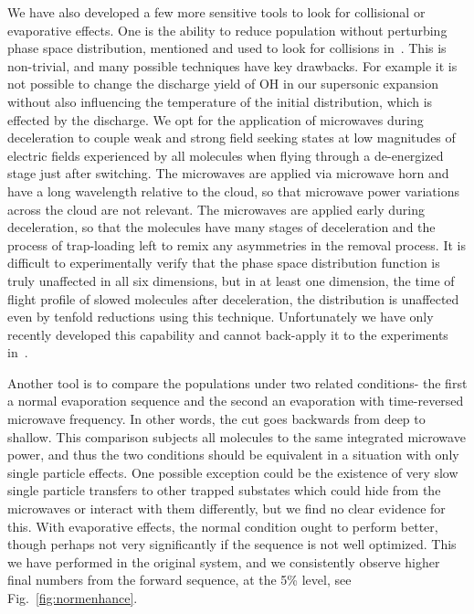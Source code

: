 \documentclass[%
 reprint,
 amsmath,amssymb,
 aps,
pra,
]{revtex4-1}
\begin{document}
We have also developed a few more sensitive tools to look for collisional or evaporative effects. 
One is the ability to reduce population without perturbing phase space distribution, mentioned and used to look for collisions in~\cite{smt}.
This is non-trivial, and many possible techniques have key drawbacks. 
For example it is not possible to change the discharge yield of OH in our supersonic expansion without also influencing the temperature of the initial distribution, which is effected by the discharge.
We opt for the application of microwaves during deceleration to couple weak and strong field seeking states at low magnitudes of electric fields experienced by all molecules when flying through a de-energized stage just after switching.
The microwaves are applied via microwave horn and have a long wavelength relative to the cloud, so that microwave power variations across the cloud are not relevant.
The microwaves are applied early during deceleration, so that the molecules have many stages of deceleration and the process of trap-loading left to remix any asymmetries in the removal process.
It is difficult to experimentally verify that the phase space distribution function is truly unaffected in all six dimensions, but in at least one dimension, the time of flight profile of slowed molecules after deceleration, the distribution is unaffected even by tenfold reductions using this technique.
Unfortunately we have only recently developed this capability and cannot back-apply it to the experiments in~\cite{Stuhl2012evap}.

Another tool is to compare the populations under two related conditions- the first a normal evaporation sequence and the second an evaporation with time-reversed microwave frequency. 
In other words, the cut goes backwards from deep to shallow. 
This comparison subjects all molecules to the same integrated microwave power, and thus the two conditions should be equivalent in a situation with only single particle effects.
One possible exception could be the existence of very slow single particle transfers to other trapped substates which could hide from the microwaves or interact with them differently, but we find no clear evidence for this.
With evaporative effects, the normal condition ought to perform better, though perhaps not very significantly if the sequence is not well optimized. 
This we have performed in the original system, and we consistently observe higher final numbers from the forward sequence, at the 5\% level, see Fig.~\ref{fig:normenhance}.
\end{document}
